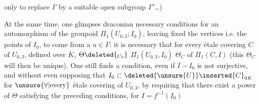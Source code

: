only to replace $\Gamma$ by a suitable open subgroup $\Gamma'$\ldots)

At the same time, one glimpses draconian necessary conditions for an automorphism \inserted{$\Theta$} of the groupoid $\Pi_1(U_{0,3};I_0)$, leaving fixed the vertices i.e. the points of $I_0$, to come from a $u\in\Gamma$: it is necessary that for every étale covering  $C$ of $U_{0,3}$, defined over $K$,      $\Theta\deleted{_{C_0}}$  $\Pi_1(U_{0,3},I_0)$   $\Theta_C$ of $\Pi_1(C,I)$     (this $\Theta_C$ will then be unique). One still finds a condition, even if $I-I_0$ is not surjective, and without even supposing that $I_0\subset \deleted{\unsure{U}}\inserted{C}_{0K}$ for $\unsure{\forall|\mathrm{every}}$ étale covering of $U_{0,3}$, by requiring that there exist a power  of $\Theta$  satisfying the preceding conditions, for $I=f^{-1}(I_0)$ 
